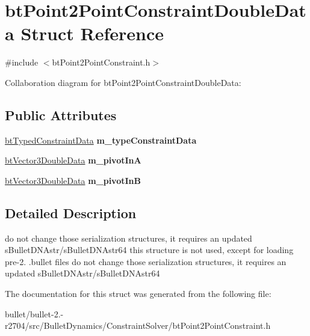 \hypertarget{structbt_point2_point_constraint_double_data}{\section{bt\+Point2\+Point\+Constraint\+Double\+Data Struct Reference}
\label{structbt_point2_point_constraint_double_data}
}


{\ttfamily \#include $<$bt\+Point2\+Point\+Constraint.\+h$>$}



Collaboration diagram for bt\+Point2\+Point\+Constraint\+Double\+Data\+:
\subsection*{Public Attributes}
\begin{DoxyCompactItemize}
\item 
\hypertarget{structbt_point2_point_constraint_double_data_a42dbadbfc52d32d257d6893a0124f91f}{\hyperlink{structbt_typed_constraint_data}{bt\+Typed\+Constraint\+Data} {\bfseries m\+\_\+type\+Constraint\+Data}}\label{structbt_point2_point_constraint_double_data_a42dbadbfc52d32d257d6893a0124f91f}

\item 
\hypertarget{structbt_point2_point_constraint_double_data_a97e7529f6441ad6f415a727cd870f0b0}{\hyperlink{structbt_vector3_double_data}{bt\+Vector3\+Double\+Data} {\bfseries m\+\_\+pivot\+In\+A}}\label{structbt_point2_point_constraint_double_data_a97e7529f6441ad6f415a727cd870f0b0}

\item 
\hypertarget{structbt_point2_point_constraint_double_data_ae5b448142428a472ad90138aa2635e47}{\hyperlink{structbt_vector3_double_data}{bt\+Vector3\+Double\+Data} {\bfseries m\+\_\+pivot\+In\+B}}\label{structbt_point2_point_constraint_double_data_ae5b448142428a472ad90138aa2635e47}

\end{DoxyCompactItemize}


\subsection{Detailed Description}
do not change those serialization structures, it requires an updated s\+Bullet\+D\+N\+Astr/s\+Bullet\+D\+N\+Astr64 this structure is not used, except for loading pre-\/2. .bullet files do not change those serialization structures, it requires an updated s\+Bullet\+D\+N\+Astr/s\+Bullet\+D\+N\+Astr64 

The documentation for this struct was generated from the following file\+:\begin{DoxyCompactItemize}
\item 
bullet/bullet-\/2.-\/r2704/src/\+Bullet\+Dynamics/\+Constraint\+Solver/bt\+Point2\+Point\+Constraint.\+h\end{DoxyCompactItemize}
